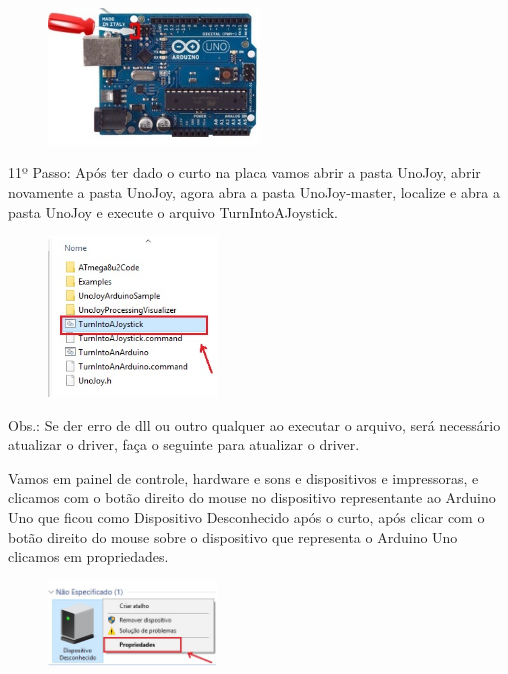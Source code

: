 \documentclass[
	12pt,			%
	openright,		%
	oneside,			%
	a4paper,			%
	chapter=TITLE,		%
	english,			%
	brazil,			%
	]{abntex2}
\begin{document}
\begin{anexosenv}
\begin{figure}[H]
	\centering
		\includegraphics[width=0.5\textwidth]{./img/anex-img-10.jpg}
\end{figure}

11º Passo: Após ter dado o curto na placa  vamos abrir a pasta UnoJoy, abrir novamente a pasta UnoJoy,  agora abra a pasta UnoJoy-master, localize e abra a pasta UnoJoy e execute o arquivo TurnIntoAJoystick.

\begin{figure}[H]
	\centering
		\includegraphics[width=0.4\textwidth]{./img/anex-img-11.jpg}
\end{figure}

Obs.: Se der erro de dll ou outro qualquer ao executar o arquivo, será necessário atualizar o driver, faça o seguinte para atualizar o driver. 

Vamos em painel de controle, hardware e sons e dispositivos e impressoras, e clicamos com o botão direito do mouse no dispositivo representante ao Arduino Uno que ficou como Dispositivo Desconhecido após o curto, após clicar com o botão direito do mouse sobre o dispositivo que representa o Arduino Uno clicamos  em propriedades.

\begin{figure}[H]
	\centering
		\includegraphics[width=0.4\textwidth]{./img/anex-img-12.jpg}
\end{figure}


\end{anexosenv}
\end{document}

